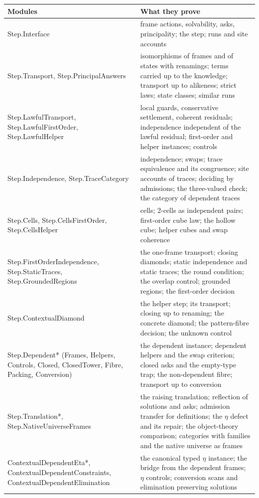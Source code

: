 \documentclass[11pt]{article}
\theoremstyle{remark}
\newcommand{\lean}[1]{{\ttfamily\def\_{\textunderscore\allowbreak}#1}}
\begin{document}
{\small
\begin{longtable}{@{}L{0.37\textwidth}L{0.58\textwidth}@{}}
\toprule
\textbf{Modules} & \textbf{What they prove} \\
\midrule
\endhead
\lean{Step.Interface} & frame actions, solvability, asks, principality; the step; runs and site accounts \\
\lean{Step.Transport}, \lean{Step.PrincipalAnswers} & isomorphisms of frames and of states with renamings; terms carried up to the knowledge; transport up to alikeness; strict laws; state classes; similar runs \\
\lean{Step.LawfulTransport}, \lean{Step.LawfulFirstOrder}, \lean{Step.LawfulHelper} & local guards, conservative settlement, coherent residuals; independence independent of the lawful residual; first-order and helper instances; controls \\
\lean{Step.Independence}, \lean{Step.TraceCategory} & independence; swaps; trace equivalence and its congruence; site accounts of traces; deciding by admissions; the three-valued check; the category of dependent traces \\
\lean{Step.Cells}, \lean{Step.CellsFirstOrder}, \lean{Step.CellsHelper} & cells; 2-cells as independent pairs; first-order cube law; the hollow cube; helper cubes and swap coherence \\
\lean{Step.FirstOrderIndependence}, \lean{Step.StaticTraces}, \lean{Step.GroundedRegions} & the one-frame transport; closing diamonds; static independence and static traces; the round condition; the overlap control; grounded regions; the first-order decision \\
\lean{Step.ContextualDiamond} & the helper step; its transport; closing up to renaming; the concrete diamond; the pattern-fibre decision; the unknown control \\
\lean{Step.Dependent*} (Frames, Helpers, Controls, Closed, ClosedTower, Fibre, Packing, Conversion) & the dependent instance; dependent helpers and the swap criterion; closed asks and the empty-type trap; the non-dependent fibre; transport up to conversion \\
\lean{Step.Translation*}, \lean{Step.NativeUniverseFrames} & the raising translation; reflection of solutions and asks; admission transfer for definitions; the $\eta$ defect and its repair; the object-theory comparison; categories with families and the native universe as frames \\
\lean{ContextualDependentEta*}, \lean{ContextualDependentConstraints}, \lean{ContextualDependentElimination} & the canonical typed $\eta$ instance; the bridge from the dependent frames; $\eta$ controls; conversion scans and elimination preserving solutions \\

\end{longtable}}
\end{document}
